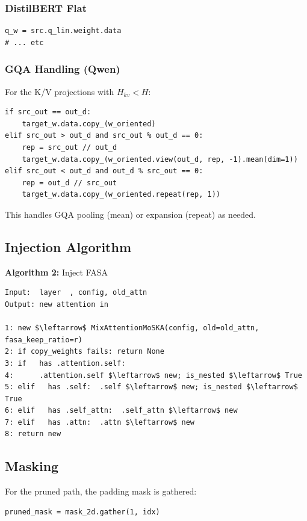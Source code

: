 \subsubsection{DistilBERT Flat}

\begin{lstlisting}
q_w = src.q_lin.weight.data
# ... etc
\end{lstlisting}

\subsubsection{GQA Handling (Qwen)}

For the K/V projections with $H_{kv} < H$:

\begin{lstlisting}
if src_out == out_d:
    target_w.data.copy_(w_oriented)
elif src_out > out_d and src_out % out_d == 0:
    rep = src_out // out_d
    target_w.data.copy_(w_oriented.view(out_d, rep, -1).mean(dim=1))
elif src_out < out_d and out_d % src_out == 0:
    rep = out_d // src_out
    target_w.data.copy_(w_oriented.repeat(rep, 1))
\end{lstlisting}

This handles GQA pooling (mean) or expansion (repeat) as needed.

\subsection{Injection Algorithm}

\textbf{Algorithm 2:} Inject FASA
\begin{lstlisting}
Input:  layer  , config, old_attn
Output: new attention in  

1: new $\leftarrow$ MixAttentionMoSKA(config, old=old_attn, fasa_keep_ratio=r)
2: if copy_weights fails: return None
3: if   has .attention.self:
4:      .attention.self $\leftarrow$ new; is_nested $\leftarrow$ True
5: elif   has .self:  .self $\leftarrow$ new; is_nested $\leftarrow$ True
6: elif   has .self_attn:  .self_attn $\leftarrow$ new
7: elif   has .attn:  .attn $\leftarrow$ new
8: return new
\end{lstlisting}

\subsection{Masking}

For the pruned path, the padding mask is gathered:

\begin{lstlisting}
pruned_mask = mask_2d.gather(1, idx)
\end{lstlisting}

